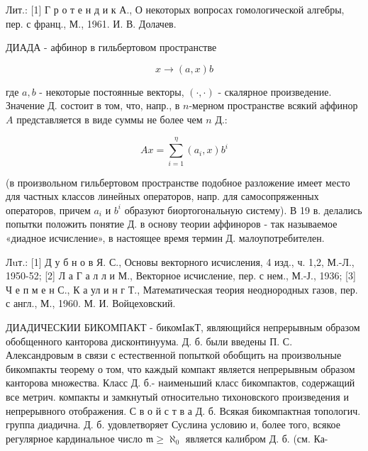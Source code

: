 \documentclass[10pt]{article}
\begin{document}
Лит.: [1] Г р о т е н д и к А., О некоторых вопросах гомологической алгебры, пер. с франц., М., 1961. И. В. Долачев.



ДИАДА - афбинор в гильбертовом пространстве



\[

x \rightarrow(a, x) b

\]



где $a, b$ - некоторые постоянные векторы, $(\cdot, \cdot)$ - скалярное произведение. Значение Д. состоит в том, что, напр., в $n$-мерном пространстве всякий аффинор $A$ представляется в виде суммы не более чем $n$ Д.:



\[

A x=\sum_{i=1}^{\eta}\left(a_{i}, x\right) b^{i}

\]



(в произвольном гильбертовом пространстве подобное разложение имеет место для частных классов линейных операторов, напр. для самосопряженных операторов, причем $a_{i}$ и $b^{i}$ образуют биортогональную систему). В 19 в. делались попытки положить понятие Д. в основу теории аффиноров - так называемое «диадное исчисление», в настоящее время термин Д. малоупотребителен.



Лuт.: [1] Д у б н о в Я. С., Основы векторного исчисления, 4 изд., ч. 1,2, М.-Л., 1950-52; [2] Л а Г а л л и М., Векторное исчисление, пер. с нем., М.-Ј., 1936; [3] Ч е п м е н С., К а ул и н г Т., Математическая теория неоднородных газов, пер. с англ., М., 1960. М. И. Войцеховский.



ДИАДИЧЕСКИИ БИКОМПАКТ - бикомІакТ, являющийся непрерывным образом обобщенного канторова дисконтинуума. Д. б. были введены П. С. Александровым в связи с естественной попыткой обобщить на произвольные бикомпакты теорему о том, что каждый компакт является непрерывным образом канторова множества. Класс Д. б.- наименьший класс бикомпактов, содержащий все метрич. компакты и замкнутый относительно тихоновского произведения и непрерывного отображения. С в о й с т в а Д. б. Всякая бикомпактная топологич. группа диадична. Д. б. удовлетворяет Суслина условию и, более того, всякое регулярное кардинальное число $\mathfrak{m} \geqslant \aleph_{0}$ является калибром Д. б. (см. Ка-
\end{document}
